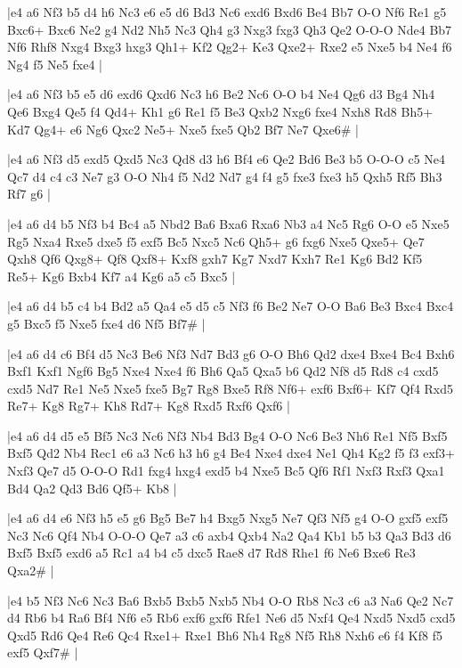 \whitename{}
\blackname{}
\makegametitle
|e4 a6 Nf3 b5 d4 h6 Nc3 e6 e5 d6 Bd3 Nc6 exd6 Bxd6 Be4 Bb7 O-O Nf6 Re1 g5 Bxc6+ Bxc6 Ne2 g4 Nd2 Nh5 Nc3 Qh4 g3 Nxg3 fxg3 Qh3 Qe2 O-O-O Nde4 Bb7 Nf6 Rhf8 Nxg4 Bxg3 hxg3 Qh1+ Kf2 Qg2+ Ke3 Qxe2+ Rxe2 e5 Nxe5 b4 Ne4 f6 Ng4 f5 Ne5 fxe4  |

\whitename{}
\blackname{}
\makegametitle
|e4 a6 Nf3 b5 e5 d6 exd6 Qxd6 Nc3 h6 Be2 Nc6 O-O b4 Ne4 Qg6 d3 Bg4 Nh4 Qe6 Bxg4 Qe5 f4 Qd4+ Kh1 g6 Re1 f5 Be3 Qxb2 Nxg6 fxe4 Nxh8 Rd8 Bh5+ Kd7 Qg4+ e6 Ng6 Qxc2 Ne5+ Nxe5 fxe5 Qb2 Bf7 Ne7 Qxe6\#  |

\whitename{}
\blackname{}
\makegametitle
|e4 a6 Nf3 d5 exd5 Qxd5 Nc3 Qd8 d3 h6 Bf4 e6 Qe2 Bd6 Be3 b5 O-O-O c5 Ne4 Qc7 d4 c4 c3 Ne7 g3 O-O Nh4 f5 Nd2 Nd7 g4 f4 g5 fxe3 fxe3 h5 Qxh5 Rf5 Bh3 Rf7 g6  |

\whitename{}
\blackname{}
\makegametitle
|e4 a6 d4 b5 Nf3 b4 Bc4 a5 Nbd2 Ba6 Bxa6 Rxa6 Nb3 a4 Nc5 Rg6 O-O e5 Nxe5 Rg5 Nxa4 Rxe5 dxe5 f5 exf5 Bc5 Nxc5 Nc6 Qh5+ g6 fxg6 Nxe5 Qxe5+ Qe7 Qxh8 Qf6 Qxg8+ Qf8 Qxf8+ Kxf8 gxh7 Kg7 Nxd7 Kxh7 Re1 Kg6 Bd2 Kf5 Re5+ Kg6 Bxb4 Kf7 a4 Kg6 a5 c5 Bxc5  |

\whitename{}
\blackname{}
\makegametitle
|e4 a6 d4 b5 c4 b4 Bd2 a5 Qa4 e5 d5 c5 Nf3 f6 Be2 Ne7 O-O Ba6 Be3 Bxc4 Bxc4 g5 Bxc5 f5 Nxe5 fxe4 d6 Nf5 Bf7\#  |

\whitename{}
\blackname{}
\makegametitle
|e4 a6 d4 c6 Bf4 d5 Nc3 Be6 Nf3 Nd7 Bd3 g6 O-O Bh6 Qd2 dxe4 Bxe4 Bc4 Bxh6 Bxf1 Kxf1 Ngf6 Bg5 Nxe4 Nxe4 f6 Bh6 Qa5 Qxa5 b6 Qd2 Nf8 d5 Rd8 c4 cxd5 cxd5 Nd7 Re1 Ne5 Nxe5 fxe5 Bg7 Rg8 Bxe5 Rf8 Nf6+ exf6 Bxf6+ Kf7 Qf4 Rxd5 Re7+ Kg8 Rg7+ Kh8 Rd7+ Kg8 Rxd5 Rxf6 Qxf6  |

\whitename{}
\blackname{}
\makegametitle
|e4 a6 d4 d5 e5 Bf5 Nc3 Nc6 Nf3 Nb4 Bd3 Bg4 O-O Nc6 Be3 Nh6 Re1 Nf5 Bxf5 Bxf5 Qd2 Nb4 Rec1 e6 a3 Nc6 h3 h6 g4 Be4 Nxe4 dxe4 Ne1 Qh4 Kg2 f5 f3 exf3+ Nxf3 Qe7 d5 O-O-O Rd1 fxg4 hxg4 exd5 b4 Nxe5 Bc5 Qf6 Rf1 Nxf3 Rxf3 Qxa1 Bd4 Qa2 Qd3 Bd6 Qf5+ Kb8  |

\whitename{}
\blackname{}
\makegametitle
|e4 a6 d4 e6 Nf3 h5 e5 g6 Bg5 Be7 h4 Bxg5 Nxg5 Ne7 Qf3 Nf5 g4 O-O gxf5 exf5 Nc3 Nc6 Qf4 Nb4 O-O-O Qe7 a3 c6 axb4 Qxb4 Na2 Qa4 Kb1 b5 b3 Qa3 Bd3 d6 Bxf5 Bxf5 exd6 a5 Rc1 a4 b4 c5 dxc5 Rae8 d7 Rd8 Rhe1 f6 Ne6 Bxe6 Re3 Qxa2\#  |

\whitename{}
\blackname{}
\makegametitle
|e4 b5 Nf3 Nc6 Nc3 Ba6 Bxb5 Bxb5 Nxb5 Nb4 O-O Rb8 Nc3 c6 a3 Na6 Qe2 Nc7 d4 Rb6 b4 Ra6 Bf4 Nf6 e5 Rb6 exf6 gxf6 Rfe1 Ne6 d5 Nxf4 Qe4 Nxd5 Nxd5 cxd5 Qxd5 Rd6 Qe4 Re6 Qc4 Rxe1+ Rxe1 Bh6 Nh4 Rg8 Nf5 Rh8 Nxh6 e6 f4 Kf8 f5 exf5 Qxf7\#  |

